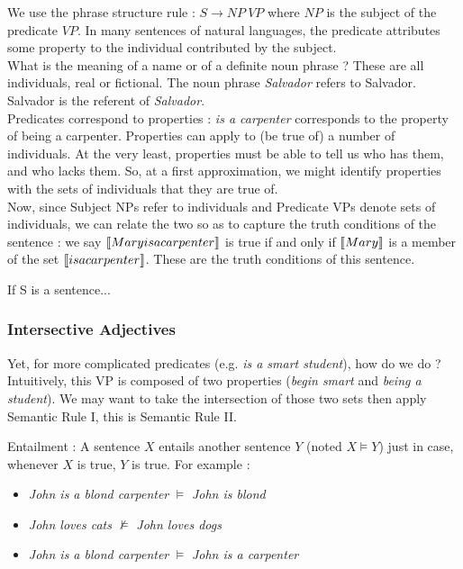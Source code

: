 \documentclass{cours}
\begin{document}
We use the phrase structure rule : $S \rightarrow NP \ VP$ where $NP$ is the subject of the predicate $VP$. In many sentences of natural languages, the predicate attributes some property to the individual contributed by the subject.\\
What is the meaning of a name or of a definite noun phrase ? These are all individuals, real or fictional. The noun phrase \textsl{Salvador} refers to Salvador. Salvador is the referent of \textsl{Salvador}.\\
Predicates correspond to properties : \textsl{is a carpenter} corresponds to the property of being a carpenter. Properties can apply to (be true of) a number of individuals. At the very least, properties must be able to tell us who has them, and who lacks them. So, at a first approximation, we might identify properties with the sets of individuals that they are true of.\\


Now, since Subject NPs refer to individuals and Predicate VPs denote sets of individuals, we can relate the two so as to capture the truth conditions of the sentence : we say $\left\llbracket Mary is a carpenter \right\rrbracket$ is true if and only if $\left\llbracket Mary \right\rrbracket$ is a member of the set $\left\llbracket is a carpenter \right\rrbracket$. These are the truth conditions of this sentence.
\begin{proposition}
    If S is a sentence...     
\end{proposition}

\subsubsection{Intersective Adjectives}
Yet, for more complicated predicates (e.g. \textsl{is a smart student}), how do we do ? Intuitively, this VP is composed of two properties (\textsl{begin smart} and \textsl{being a student}). We may want to take the intersection of those two sets then apply Semantic Rule I, this is Semantic Rule II. 
\begin{definition}
    Entailment : A sentence $X$ entails another sentence $Y$ (noted $X \models Y$) just in case, whenever $X$ is true, $Y$ is true. For example : 
    \begin{itemize}
        \item \textsl{John is a blond carpenter} $\vDash$ \textsl{John is blond}
        \item \textsl{John loves cats} $\nvDash$ \textsl{John loves dogs}
        \item \textsl{John is a blond carpenter} $\vDash$ \textsl{John is a carpenter}
    \end{itemize}
\end{definition}
\end{document}
